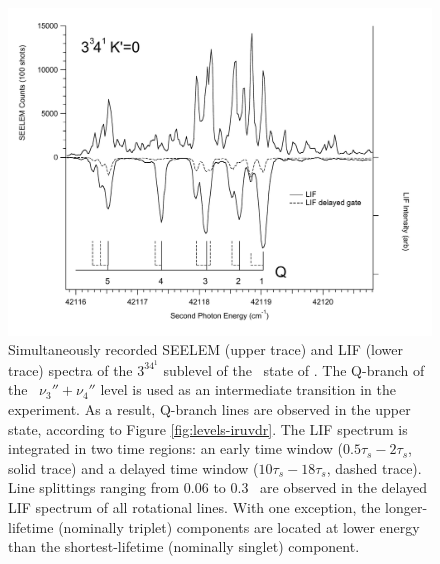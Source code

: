 \begin{figure}
  \caption{Simultaneously recorded SEELEM (upper trace) and LIF (lower
    trace) spectra of the $3^34^1$  sublevel of the \astate\
    state of .  The Q-branch of the \xstate\ $\nu_3'' +
    \nu_4''$ level is used as an intermediate transition in the
    experiment.  As a result, Q-branch lines are observed in the upper
    state, according to Figure \ref{fig:levels-iruvdr}.  The LIF
    spectrum is integrated in two time regions: an early time window
    ($0.5\tau_s-2\tau_s$, solid trace) and a delayed time window
    ($10\tau_s-18\tau_s$, dashed trace).  Line splittings ranging from
    0.06 to 0.3 \rcm\ are observed in the delayed LIF spectrum of all
    rotational lines.  With one exception, the longer-lifetime
    (nominally triplet) components are located at lower energy than
    the shortest-lifetime (nominally singlet) component.}
  \label{fig:survey-3341}
  \centering
  \includegraphics[width=7in,angle=90]{spectrum-3341-q5q1-primed.pdf}
\end{figure}

